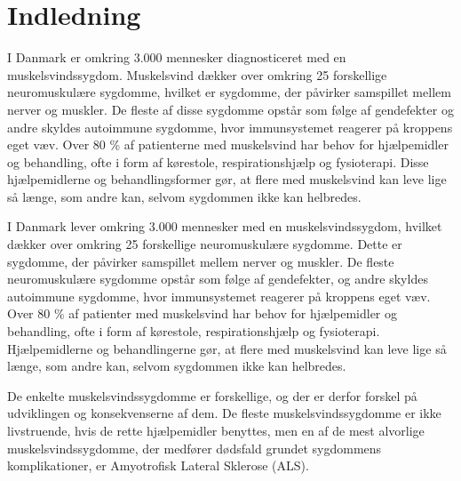 \section{Indledning}



I Danmark er omkring 3.000 mennesker diagnosticeret med en muskelsvindssygdom. Muskelsvind dækker over omkring 25 forskellige neuromuskulære sygdomme, hvilket er sygdomme, der påvirker samspillet mellem nerver og muskler. De fleste af disse sygdomme opstår som følge af gendefekter og andre skyldes autoimmune sygdomme, hvor immunsystemet reagerer på kroppens eget væv. Over 80 \% af patienterne med muskelsvind har behov for hjælpemidler og behandling, ofte i form af kørestole, respirationshjælp og fysioterapi. Disse hjælpemidlerne og behandlingsformer gør, at flere med muskelsvind kan leve lige så længe, som andre kan, selvom sygdommen ikke kan helbredes. \citep{hvadermuskelsvind2016,sygdomsbeskrivelser2016}

I Danmark lever omkring 3.000 mennesker med en muskelsvindssygdom, hvilket dækker over omkring 25 forskellige neuromuskulære sygdomme. Dette er sygdomme, der påvirker samspillet mellem nerver og muskler. De fleste neuromuskulære sygdomme opstår som følge af gendefekter, og andre skyldes autoimmune sygdomme, hvor immunsystemet reagerer på kroppens eget væv. Over 80 \% af patienter med muskelsvind har behov for hjælpemidler og behandling, ofte i form af kørestole, respirationshjælp og fysioterapi. Hjælpemidlerne og behandlingerne gør, at flere med muskelsvind kan leve lige så længe, som andre kan, selvom sygdommen ikke kan helbredes. \citep{hvadermuskelsvind2016,sygdomsbeskrivelser2016}


De enkelte muskelsvindssygdomme er forskellige, og der er derfor forskel på udviklingen og konsekvenserne af dem. De fleste muskelsvindssygdomme er ikke livstruende, hvis de rette hjælpemidler benyttes, men en af de mest alvorlige muskelsvindssygdomme, der medfører dødsfald grundet sygdommens komplikationer, er Amyotrofisk Lateral Sklerose (ALS).  \citep{hvadermuskelsvind2016}

